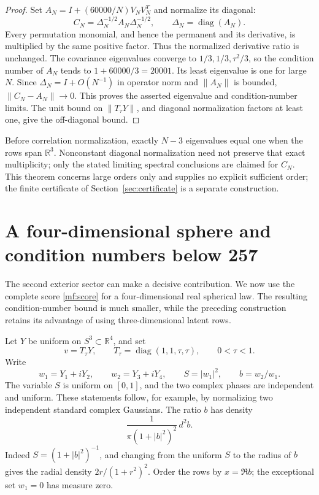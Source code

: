 \begin{proof}
Set \(A_N=I+(60000/N)V_NV_N^T\) and normalize its diagonal:
\[
 C_N=\Delta_N^{-1/2}A_N\Delta_N^{-1/2},\qquad
 \Delta_N=\operatorname{diag}(A_N).
\]
Every permutation monomial, and hence the permanent and its derivative,
is multiplied by the same positive factor. Thus the normalized derivative
ratio is unchanged.
The covariance eigenvalues converge to \(1/3,1/3,\tau^2/3\), so the
condition number of \(A_N\) tends to \(1+60000/3=20001\).
Its least eigenvalue is one for large \(N\).
Since \(\Delta_N=I+O(N^{-1})\) in operator norm and \(\|A_N\|\) is
bounded, \(\|C_N-A_N\|\to0\). This proves the asserted eigenvalue and
condition-number limits. The unit bound on \(\|T_\tau Y\|\), and
diagonal normalization factors at least one, give the off-diagonal bound.
\end{proof}

Before correlation normalization, exactly \(N-3\) eigenvalues equal one
when the rows span \(\mathbb R^3\). Nonconstant diagonal normalization
need not preserve that exact multiplicity; only the stated limiting
spectral conclusions are claimed for \(C_N\).
This theorem concerns large orders only and supplies no explicit
sufficient order; the finite certificate of Section~\ref{sec:certificate}
is a separate construction.

\section{A four-dimensional sphere and condition numbers below 257}
\label{mf:four-sphere}

The second exterior sector can make a decisive contribution. We now use
the complete score \eqref{mf:score} for a four-dimensional real spherical
law. The resulting condition-number bound is much smaller, while the
preceding construction retains its advantage of using three-dimensional
latent rows.

Let \(Y\) be uniform on \(S^3\subset\mathbb R^4\), and set
\[
 v=T_\tau Y,\qquad T_\tau=\operatorname{diag}(1,1,\tau,\tau),
 \qquad 0<\tau<1.
\]
Write
\[
 w_1=Y_1+iY_2,\qquad w_2=Y_3+iY_4,\qquad
 S=|w_1|^2,\qquad b=w_2/w_1.
\]
The variable \(S\) is uniform on \([0,1]\), and the two complex phases
are independent and uniform. These statements follow, for example, by
normalizing two independent standard complex Gaussians.
The ratio \(b\) has density
\begin{equation}\label{mf:complex-cauchy}
 \frac{1}{\pi(1+|b|^2)^2}\,d^2b.
\end{equation}
Indeed \(S=(1+|b|^2)^{-1}\), and changing from the uniform \(S\) to the
radius of \(b\) gives the radial density \(2r/(1+r^2)^2\).
Order the rows by \(x=\Re b\); the exceptional set \(w_1=0\) has
measure zero.

